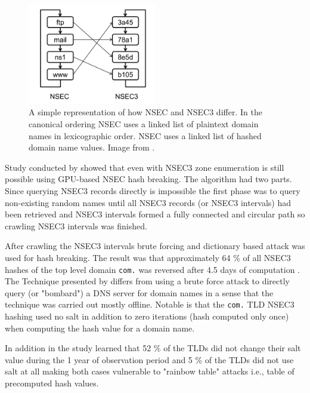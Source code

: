 \begin{figure}[htb]
  \begin{center}
    \includegraphics[width=0.5\textwidth]{nsec3.png}
    \caption{A simple representation of how NSEC and NSEC3 differ. In the canonical ordering NSEC uses a linked list of plaintext domain names in lexicographic order. NSEC uses a linked list of hashed domain name values. Image from \cite{NSEC3_hash_breaking}.} 
    \label{fig:hash_list}
  \end{center}
\end{figure}

Study conducted by \citet{NSEC3_hash_breaking} showed that even with NSEC3 zone enumeration is still possible using GPU-based NSEC hash breaking. The algorithm had two parts. Since querying NSEC3 records directly is impossible the first phase was to query non-existing random names until all NSEC3 records (or NSEC3 intervals) had been retrieved and NSEC3 intervals formed a fully connected and circular path so crawling NSEC3 intervals was finished.



After crawling the NSEC3 intervals brute forcing and dictionary based attack was used for hash breaking. The result was that approximately 64 \% of all NSEC3 hashes of the top level domain \texttt{com.} was reversed after 4.5 days of computation \cite{NSEC3_hash_breaking}. The Technique presented by \citet{NSEC3_hash_breaking} differs from using a brute force attack to directly query (or "bombard") a DNS server for domain names in a sense that the technique was carried out mostly offline. Notable is that the \texttt{com.} TLD NSEC3 hashing  used no salt in addition to zero iterations (hash computed only once) when computing the hash value for a domain name.


In addition in the study \citet{NSEC3_hash_breaking} learned that 52 \% of the TLDs did not change their salt value during the 1 year of observation period and 5 \% of the TLDs did not use salt at all making both cases vulnerable to "rainbow table" attacks i.e., table of precomputed hash values.

